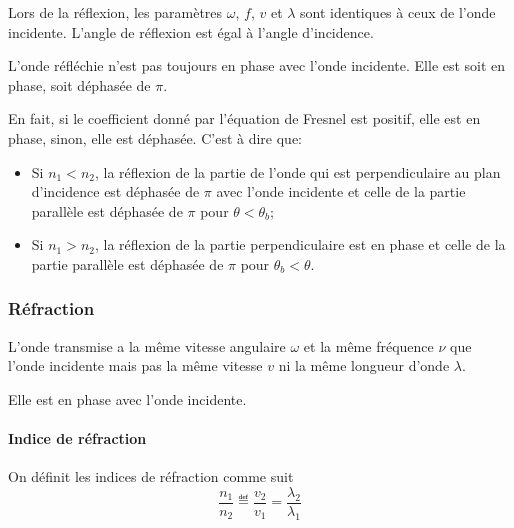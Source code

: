Lors de la réflexion, les paramètres $\omega$, $f$, $v$ et $\lambda$
sont identiques à ceux de l'onde incidente.
L'angle de réflexion est égal à l'angle d'incidence.

L'onde réfléchie n'est pas toujours en phase avec l'onde incidente.
Elle est soit en phase, soit déphasée de $\pi$.

En fait, si le coefficient donné par l'équation de Fresnel est positif,
elle est en phase, sinon, elle est déphasée.
C'est à dire que:
\begin{itemize}
  \item Si $n_1 < n_2$, la réflexion de la partie de l'onde
    qui est perpendiculaire au plan
    d'incidence est déphasée de $\pi$ avec l'onde incidente
    et celle de la partie parallèle est déphasée de $\pi$
    pour $\theta < \theta_b$;
  \item Si $n_1 > n_2$, la réflexion de la partie perpendiculaire est
    en phase et celle de la partie parallèle est déphasée de $\pi$
    pour $\theta_b < \theta$.
\end{itemize}


\subsubsection{Réfraction}
L'onde transmise a la même vitesse angulaire $\omega$
et la même fréquence $\nu$ que l'onde incidente
mais pas la même vitesse $v$ ni la même longueur d'onde $\lambda$.

Elle est en phase avec l'onde incidente.

\paragraph{Indice de réfraction}
On définit les indices de réfraction comme suit
\[ \frac{n_1}{n_2} \eqdef \frac{v_2}{v_1} = \frac{\lambda_2}{\lambda_1} \]

